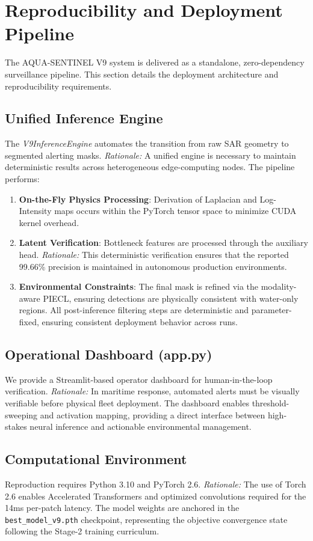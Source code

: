 \section{Reproducibility and Deployment Pipeline}
The AQUA-SENTINEL V9 system is delivered as a standalone, zero-dependency surveillance pipeline. This section details the deployment architecture and reproducibility requirements.

\subsection{Unified Inference Engine}
The \textit{V9InferenceEngine} automates the transition from raw SAR geometry to segmented alerting masks. \textit{Rationale:} A unified engine is necessary to maintain deterministic results across heterogeneous edge-computing nodes. The pipeline performs:
\begin{enumerate}
    \item \textbf{On-the-Fly Physics Processing}: Derivation of Laplacian and Log-Intensity maps occurs within the PyTorch tensor space to minimize CUDA kernel overhead.
    \item \textbf{Latent Verification}: Bottleneck features are processed through the auxiliary head. \textit{Rationale:} This deterministic verification ensures that the reported 99.66\% precision is maintained in autonomous production environments.
    \item \textbf{Environmental Constraints}: The final mask is refined via the modality-aware PIECL, ensuring detections are physically consistent with water-only regions. All post-inference filtering steps are deterministic and parameter-fixed, ensuring consistent deployment behavior across runs.
\end{enumerate}

\subsection{Operational Dashboard (app.py)}
We provide a Streamlit-based operator dashboard for human-in-the-loop verification. \textit{Rationale:} In maritime response, automated alerts must be visually verifiable before physical fleet deployment. The dashboard enables threshold-sweeping and activation mapping, providing a direct interface between high-stakes neural inference and actionable environmental management.

\subsection{Computational Environment}
Reproduction requires Python 3.10 and PyTorch 2.6. \textit{Rationale:} The use of Torch 2.6 enables Accelerated Transformers and optimized convolutions required for the 14ms per-patch latency. The model weights are anchored in the \texttt{best\_model\_v9.pth} checkpoint, representing the objective convergence state following the Stage-2 training curriculum.
